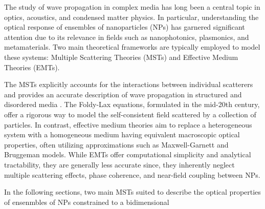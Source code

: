 
The study of wave propagation in complex media has long been a central topic in optics, acoustics, and condensed matter physics. In particular, understanding the optical response of ensembles of nanoparticles (NPs) has garnered significant attention due to its relevance in fields such as nanophotonics, plasmonics, and metamaterials. Two main theoretical frameworks are typically employed to model these systems: Multiple Scattering Theories (MSTs) and Effective Medium Theories (EMTs).

The MSTs explicitly accounts for the interactions between individual scatterers and provides an accurate description of wave propagation in structured and disordered media \cite{loiko_monolayers_1998,barrera1991optical,reyes2018analytical}. The Foldy-Lax equations, formulated in the mid-20th century, offer a rigorous way to model the self-consistent field scattered by a collection of particles. In contrast, effective medium theories aim to replace a heterogeneous system with a homogeneous medium having equivalent macroscopic optical properties, often utilizing approximations such as Maxwell-Garnett and Bruggeman models. While EMTs offer computational simplicity and analytical tractability, they are generally less accurate since, they inherently neglect multiple scattering effects, phase coherence, and near-field coupling between NPs. 

In the following sections, two main MSTs suited to describe the optical properties of ensenmbles of NPs constrained to a bidimensional 